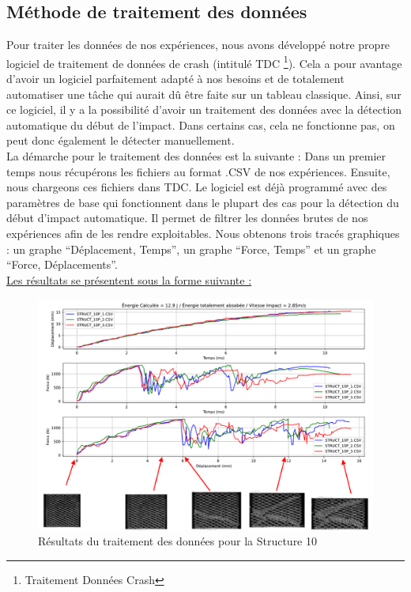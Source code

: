 \documentclass[a4paper]{article}
\begin{document}
	\subsection{Méthode de traitement des données}
	
	\hspace{0.5cm}Pour traiter les données de nos expériences, nous avons développé notre propre logiciel de traitement de données de crash (intitulé TDC \footnote{Traitement Données Crash}). Cela a pour avantage d’avoir un logiciel parfaitement adapté à nos besoins et de totalement automatiser une tâche qui aurait dû être faite sur un tableau classique. Ainsi, sur ce logiciel, il y a la possibilité d’avoir un traitement des données avec la détection automatique du début de l’impact. Dans certains cas, cela ne fonctionne pas, on peut donc également le détecter manuellement.\\ 
	
	La démarche pour le traitement des données est la suivante : 
	Dans un premier temps nous récupérons les fichiers au format .CSV de nos expériences. Ensuite, nous chargeons ces fichiers dans TDC. Le logiciel est déjà programmé avec des paramètres de base qui fonctionnent dans le plupart des cas pour la détection du début d'impact automatique. Il permet de filtrer les données brutes de nos expériences afin de les rendre exploitables. Nous obtenons trois tracés graphiques : un graphe “Déplacement, Temps”, un graphe “Force, Temps” et un graphe “Force, Déplacements”.\\
	
	\underline{Les résultats se présentent sous la forme suivante :}\\
	
	\begin{figure}[H]
		\centering
		\includegraphics[width=16cm]{Images/7/7_1/TDC_STRUCT_10.pdf}
		\caption{Résultats du traitement des données pour la Structure 10}
	\end{figure}
	
\end{document}
